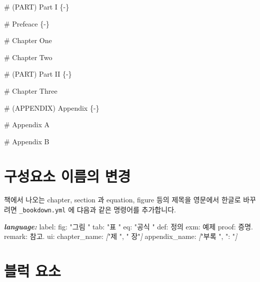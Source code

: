 \documentclass[
]{book}
\newenvironment{Shaded}{\begin{snugshade}}{\end{snugshade}}
\newcommand{\AnnotationTok}[1]{\textcolor[rgb]{0.56,0.35,0.01}{\textbf{\textit{#1}}}}
\newcommand{\CommentTok}[1]{\textcolor[rgb]{0.56,0.35,0.01}{\textit{#1}}}
\newcommand{\FunctionTok}[1]{\textcolor[rgb]{0.00,0.00,0.00}{#1}}
\newcommand{\NormalTok}[1]{#1}
\newcommand{\OtherTok}[1]{\textcolor[rgb]{0.56,0.35,0.01}{#1}}
\theoremstyle{definition}
\theoremstyle{definition}
\theoremstyle{definition}
\theoremstyle{definition}
\theoremstyle{remark}
\begin{document}
\begin{Shaded}
\begin{Highlighting}[]
\FunctionTok{\# (PART) Part I \{{-}\} }

\FunctionTok{\# Prefeace \{{-}\}}

\FunctionTok{\# Chapter One}

\FunctionTok{\# Chapter Two}

\FunctionTok{\# (PART) Part II \{{-}\} }

\FunctionTok{\# Chapter Three}

\FunctionTok{\# (APPENDIX) Appendix \{{-}\} }

\FunctionTok{\# Appendix A}

\FunctionTok{\# Appendix B}
\end{Highlighting}
\end{Shaded}

\hypertarget{uxad6cuxc131uxc694uxc18c-uxc774uxb984uxc758-uxbcc0uxacbd}{%
\section{구성요소 이름의 변경}\label{uxad6cuxc131uxc694uxc18c-uxc774uxb984uxc758-uxbcc0uxacbd}}

책에서 나오는 chapter, section 과 equation, figure 등의 제목을 영문에서 한글로 바꾸려면
\texttt{\_bookdown.yml} 에 댜음과 같은 명령어를 추가합니다.

\begin{Shaded}
\begin{Highlighting}[]
\AnnotationTok{language:}
\NormalTok{  label:}
\NormalTok{    fig: "그림 "}
\NormalTok{    tab: "표 "}
\NormalTok{    eq:  "공식 "}
\NormalTok{    def: \textquotesingle{}정의 \textquotesingle{}}
\NormalTok{    exm: \textquotesingle{}예제 \textquotesingle{}}
\NormalTok{    proof: \textquotesingle{}증명. \textquotesingle{}}
\NormalTok{    remark: \textquotesingle{}참고. \textquotesingle{}}
\NormalTok{  ui:}
\NormalTok{    chapter\_name: }\CommentTok{[}\OtherTok{"제 ", " 장"}\CommentTok{]}
\NormalTok{    appendix\_name: }\CommentTok{[}\OtherTok{"부록 ", ": "}\CommentTok{]}
\end{Highlighting}
\end{Shaded}

\hypertarget{uxbe14uxb7ed-uxc694uxc18c}{%
\section{블럭 요소}\label{uxbe14uxb7ed-uxc694uxc18c}}
\end{document}
